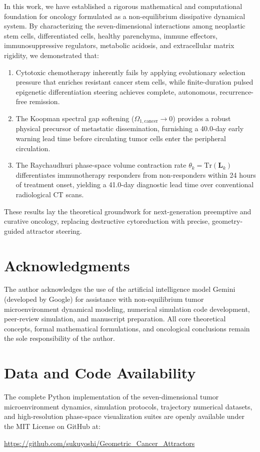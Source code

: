 \documentclass[11pt,a4paper]{article}
\begin{document}
In this work, we have established a rigorous mathematical and computational foundation for oncology formulated as a non-equilibrium dissipative dynamical system. By characterizing the seven-dimensional interactions among neoplastic stem cells, differentiated cells, healthy parenchyma, immune effectors, immunosuppressive regulators, metabolic acidosis, and extracellular matrix rigidity, we demonstrated that:
\begin{enumerate}
    \item Cytotoxic chemotherapy inherently fails by applying evolutionary selection pressure that enriches resistant cancer stem cells, while finite-duration pulsed epigenetic differentiation steering achieves complete, autonomous, recurrence-free remission.
    \item The Koopman spectral gap softening ($\Omega_{1,\mathrm{cancer}} \to 0$) provides a robust physical precursor of metastatic dissemination, furnishing a 40.0-day early warning lead time before circulating tumor cells enter the peripheral circulation.
    \item The Raychaudhuri phase-space volume contraction rate $\theta_k = \mathrm{Tr}(\bm{L}_k)$ differentiates immunotherapy responders from non-responders within 24 hours of treatment onset, yielding a 41.0-day diagnostic lead time over conventional radiological CT scans.
\end{enumerate}

These results lay the theoretical groundwork for next-generation preemptive and curative oncology, replacing destructive cytoreduction with precise, geometry-guided attractor steering.

\section*{Acknowledgments}
The author acknowledges the use of the artificial intelligence model Gemini (developed by Google) for assistance with non-equilibrium tumor microenvironment dynamical modeling, numerical simulation code development, peer-review simulation, and manuscript preparation. All core theoretical concepts, formal mathematical formulations, and oncological conclusions remain the sole responsibility of the author.

\section*{Data and Code Availability}
The complete Python implementation of the seven-dimensional tumor microenvironment dynamics, simulation protocols, trajectory numerical datasets, and high-resolution phase-space visualization suites are openly available under the MIT License on GitHub at:
\begin{center}
\url{https://github.com/sukuyoshi/Geometric_Cancer_Attractors}
\end{center}
\end{document}
